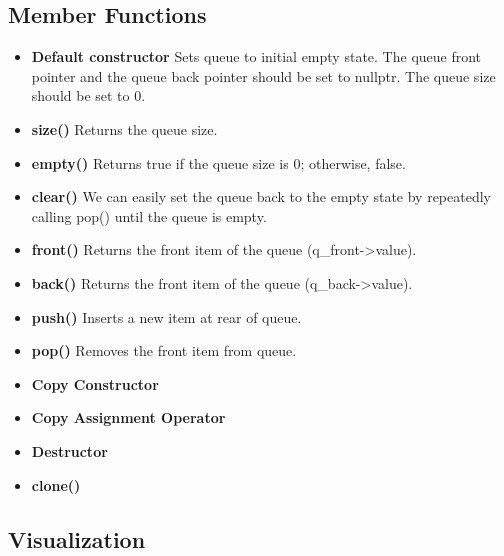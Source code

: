 \documentclass{report}
\begin{document}
    \bigbreak \noindent 
    \subsection{Member Functions}
    \begin{itemize}
        \item \textbf{Default constructor} Sets queue to initial empty state. The queue front pointer and the queue back pointer should be set to nullptr. The queue size should be set to 0.
        \item \textbf{size()} Returns the queue size.
        \item \textbf{empty()} Returns true if the queue size is 0; otherwise, false.
        \item \textbf{clear()} We can easily set the queue back to the empty state by repeatedly calling pop() until the queue is empty.
        \item \textbf{front()} Returns the front item of the queue (q\_front->value).
        \item \textbf{back()} Returns the front item of the queue (q\_back->value).
        \item \textbf{push()} Inserts a new item at rear of queue.
        \item \textbf{pop()} Removes the front item from queue.
        \item \textbf{Copy Constructor}
        \item \textbf{Copy Assignment Operator}
        \item \textbf{Destructor}
        \item \textbf{clone()}
    \end{itemize}

    \pagebreak 
    \subsection{Visualization}
    \bigbreak \noindent 
    \begin{figure}[ht]
        \centering
        \label{fig:vis}
    \end{figure}

    \pagebreak 
\end{document}
